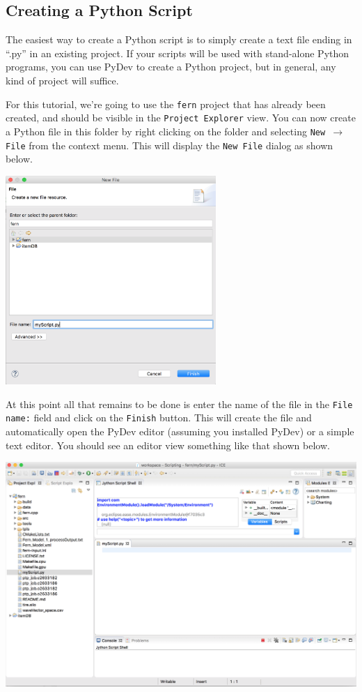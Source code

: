 \subsection{Creating a Python Script}

The easiest way to create a Python script is to simply create a text file ending
in ``.py'' in an existing project. If your scripts will be used with stand-alone Python
programs, you can use PyDev to create a Python project, but in general, any kind
of project will suffice.

For this tutorial, we're going to use the \texttt{fern} project that has
already been created, and should be visible in the \texttt{Project Explorer}
view. You can now create a Python file in this folder by right clicking on the
folder and selecting \texttt{New $\rightarrow$ File} from the context menu. 
This will display the \texttt{New File} dialog as shown below.

\begin{center} \includegraphics[width=8cm]{images/newfile}
\end{center}

At this point all that remains to be done is enter the name of the file in the
\texttt{File name:} field and click on the \texttt{Finish} button. This will
create the file and automatically open the PyDev editor (assuming you installed
PyDev) or a simple text editor. You should see an editor view something like
that shown below.

\begin{center} \includegraphics[width=\textwidth]{images/editor}
\end{center}

